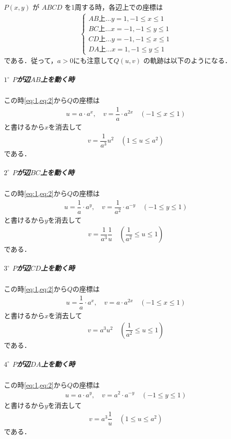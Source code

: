 \documentclass[../../main.tex]{subfiles}
\begin{document}
$P(x,y)$ が $ABCD$ を1周する時，各辺上での座標は
\begin{align}
  \begin{cases}
    AB \text{上} \dots y = 1, -1 \le x \le 1  \\
    BC \text{上} \dots x = -1, -1 \le y \le 1 \\
    CD \text{上} \dots y = -1, -1 \le x \le 1 \\
    DA \text{上} \dots x = 1, -1 \le y \le 1
  \end{cases} \label{eq:2}
\end{align}
である．従って，$a>0$にも注意して$Q(u, v)$ の軌跡は以下のようになる．

\subparagraph{$1^\circ$ $P$が辺$AB$上を動く時}

この時\cref{eq:1,eq:2}から$Q$の座標は
\begin{align}
  u = a \cdot a^x, \quad v = \dfrac{1}{a} \cdot a^{2x} \quad (-1 \le x \le 1)
\end{align}
と書けるから$x$を消去して
\begin{align}
  v = \dfrac{1}{a^3} u^2 \quad (1 \le u \le a^2)
\end{align}
である．

\subparagraph{$2^\circ$ $P$が辺$BC$上を動く時}

この時\cref{eq:1,eq:2}から$Q$の座標は
\begin{align}
  u = \dfrac{1}{a} \cdot a^y, \quad v = \dfrac{1}{a^2} \cdot a^{-y} \quad (-1 \le y \le 1)
\end{align}
と書けるから$y$を消去して
\begin{align}
  v = \dfrac{1}{a^3} \dfrac{1}{u} \quad \left(\dfrac{1}{a^2} \le u \le 1\right)
\end{align}
である．

\subparagraph{$3^\circ$ $P$が辺$CD$上を動く時}

この時\cref{eq:1,eq:2}から$Q$の座標は
\begin{align}
  u = \dfrac{1}{a} \cdot a^x, \quad v = a \cdot a^{2x} \quad (-1 \le x \le 1)
\end{align}
と書けるから$x$を消去して
\begin{align}
  v = a^3 u^2 \quad \left(\dfrac{1}{a^2} \le u \le 1\right)
\end{align}
である．

\subparagraph{$4^\circ$ $P$が辺$DA$上を動く時}

この時\cref{eq:1,eq:2}から$Q$の座標は
\begin{align}
  u = a \cdot a^y, \quad v = a^2 \cdot a^{-y} \quad (-1 \le y \le 1)
\end{align}
と書けるから$y$を消去して
\begin{align}
  v = a^3 \dfrac{1}{u} \quad (1 \le u \le a^2)
\end{align}
である．
\casesend
\end{document}
